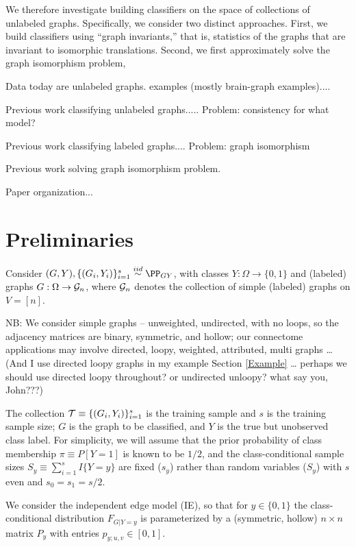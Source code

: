 We therefore investigate building classifiers on the space of collections of unlabeled graphs.  Specifically, we consider two distinct approaches. First, we build classifiers using ``graph invariants,'' that is, statistics of the graphs that are invariant to isomorphic translations.  Second, we first approximately solve the graph isomorphism problem,  





Data today are unlabeled graphs.  examples (mostly brain-graph examples)....

Previous work classifying unlabeled graphs..... Problem: consistency for what model?

Previous work classifying labeled graphs.... Problem: graph isomorphism

Previous work solving graph isomorphism problem.

Paper organization...

\section{Preliminaries} %
\label{sec:preliminaries}



Consider $(G,Y),\{(G_i,Y_i)\}_{i=1}^s \overset{iid}{\sim} \PP_{GY}$,
with classes $Y:\Omega \rightarrow \{0,1\}$ and
(labeled) graphs $G:\Omega \rightarrow \mathcal{G}_n$,
where $\mathcal{G}_n$ denotes the collection of simple (labeled) graphs on $V=[n]$.

NB:
We consider simple graphs -- unweighted, undirected, with no loops,
so the adjacency matrices are binary, symmetric, and hollow;
our connectome applications
may involve {directed, loopy, weighted, attributed, multi} graphs \ldots
(And I use directed loopy graphs in my example Section \ref{Example} \dots
perhaps we should use directed loopy throughout? or undirected unloopy? what say you, John???)

The collection
$\mathcal{T} \equiv \{(G_i,Y_i)\}_{i=1}^s$ is the training sample
and $s$ is the training sample size;
$G$ is the graph to be classified,
and $Y$ is the true but unobserved class label.
For simplicity, we will assume that the prior probability of class membership
$\pi \equiv P[Y=1]$ is known to be $1/2$,
and the class-conditional sample sizes $S_y \equiv \sum_{i=1}^s I\{Y=y\}$
are fixed ($s_y$) rather than random variables ($S_y$)
with $s$ even and $s_0=s_1=s/2$.

We consider the independent edge model (IE),
so that for $y \in \{0,1\}$ the class-conditional distribution $F_{G|Y=y}$
is parameterized by a (symmetric, hollow)
$n \times n$ matrix $P_y$ with entries $p_{y;u,v} \in [0,1]$.

